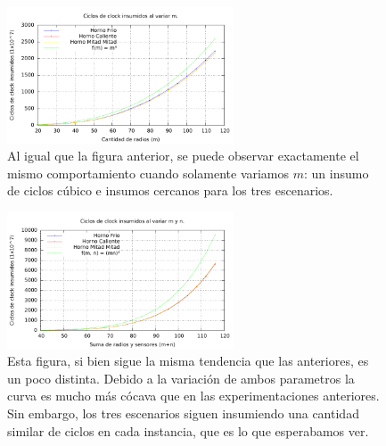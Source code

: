 \begin{figure}
  \caption{ Al igual que la figura anterior, se puede observar exactamente el mismo comportamiento cuando solamente variamos $m$: un insumo de ciclos cúbico e insumos cercanos para los tres escenarios. \newline \newline \newline \newline \newline \newline \newline \newline}
  \includegraphics[width=0.6\textwidth]{../src/experimentacion/PDFs/radios.pdf}
\end{figure}

\begin{figure}
  \caption{ Esta figura, si bien sigue la misma tendencia que las anteriores, es un poco distinta. Debido a la variación de ambos parametros la curva es mucho más cócava que en las experimentaciones anteriores. Sin embargo, los tres escenarios siguen insumiendo una cantidad similar de ciclos en cada instancia, que es lo que esperabamos ver.\newline \newline \newline \newline}
  \includegraphics[width=0.6\textwidth]{../src/experimentacion/PDFs/ambos.pdf}
\end{figure}

